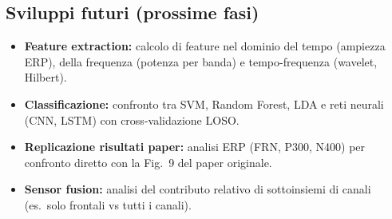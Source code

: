 \documentclass[12pt, a4paper]{article}
\begin{document}
\subsection{Sviluppi futuri (prossime fasi)}

\begin{itemize}
    \item \textbf{Feature extraction:} calcolo di feature nel dominio del tempo (ampiezza ERP), della frequenza (potenza per banda) e tempo-frequenza (wavelet, Hilbert).
    \item \textbf{Classificazione:} confronto tra SVM, Random Forest, LDA e reti neurali (CNN, LSTM) con cross-validazione LOSO.
    \item \textbf{Replicazione risultati paper:} analisi ERP (FRN, P300, N400) per confronto diretto con la Fig.\ 9 del paper originale.
    \item \textbf{Sensor fusion:} analisi del contributo relativo di sottoinsiemi di canali (es.\ solo frontali vs tutti i canali).
\end{itemize}
\end{document}
